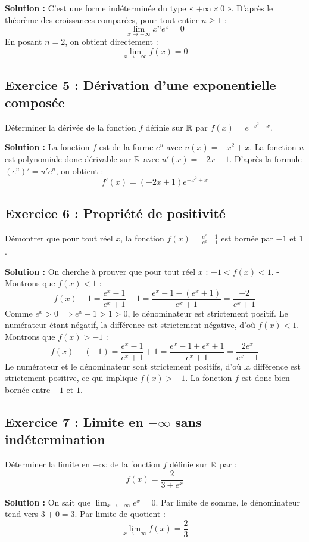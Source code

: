 \textbf{Solution :}
C'est une forme indéterminée du type « $+\infty \times 0$ ».
D'après le théorème des croissances comparées, pour tout entier $n \ge 1$ :
\[
\lim_{x \to -\infty} x^n e^x = 0
\]
En posant $n = 2$, on obtient directement :
\[
\lim_{x \to -\infty} f(x) = 0
\]

\subsection*{Exercice 5 : Dérivation d'une exponentielle composée}
Déterminer la dérivée de la fonction $f$ définie sur $\mathbb{R}$ par $f(x) = e^{-x^2 + x}$.

\textbf{Solution :}
La fonction $f$ est de la forme $e^u$ avec $u(x) = -x^2 + x$.
La fonction $u$ est polynomiale donc dérivable sur $\mathbb{R}$ avec $u'(x) = -2x + 1$.
D'après la formule $(e^u)' = u' e^u$, on obtient :
\[
f'(x) = (-2x + 1)e^{-x^2 + x}
\]

\subsection*{Exercice 6 : Propriété de positivité}
Démontrer que pour tout réel $x$, la fonction $f(x) = \frac{e^x - 1}{e^x + 1}$ est bornée par $-1$ et $1$.

\textbf{Solution :}
On cherche à prouver que pour tout réel $x$ : $-1 < f(x) < 1$.
- Montrons que $f(x) < 1$ :
  \[
  f(x) - 1 = \frac{e^x - 1}{e^x + 1} - 1 = \frac{e^x - 1 - (e^x + 1)}{e^x + 1} = \frac{-2}{e^x + 1}
  \]
  Comme $e^x > 0 \implies e^x + 1 > 1 > 0$, le dénominateur est strictement positif. Le numérateur étant négatif, la différence est strictement négative, d'où $f(x) < 1$.
- Montrons que $f(x) > -1$ :
  \[
  f(x) - (-1) = \frac{e^x - 1}{e^x + 1} + 1 = \frac{e^x - 1 + e^x + 1}{e^x + 1} = \frac{2e^x}{e^x + 1}
  \]
  Le numérateur et le dénominateur sont strictement positifs, d'où la différence est strictement positive, ce qui implique $f(x) > -1$.
La fonction $f$ est donc bien bornée entre $-1$ et $1$.

\subsection*{Exercice 7 : Limite en $-\infty$ sans indétermination}
Déterminer la limite en $-\infty$ de la fonction $f$ définie sur $\mathbb{R}$ par :
\[
f(x) = \frac{2}{3 + e^x}
\]

\textbf{Solution :}
On sait que $\lim_{x \to -\infty} e^x = 0$.
Par limite de somme, le dénominateur tend vers $3 + 0 = 3$.
Par limite de quotient :
\[
\lim_{x \to -\infty} f(x) = \frac{2}{3}
\]

